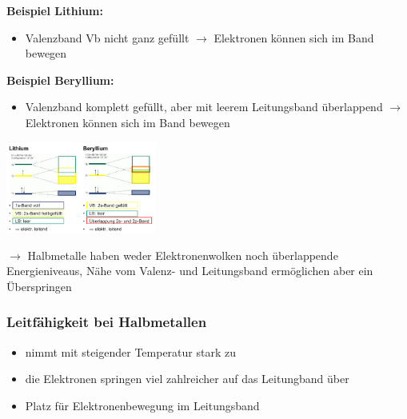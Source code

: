 \begin{minipage}{0.48\columnwidth}
	\textbf{Beispiel Lithium:}
	\begin{itemize}
		\item Valenzband Vb nicht ganz gefüllt
		$\rightarrow$ Elektronen können sich im Band bewegen
	\end{itemize}
\end{minipage}
 \hfill
\begin{minipage}{0.48\columnwidth}
	\textbf{Beispiel Beryllium:}
	\begin{itemize}
		\item Valenzband komplett gefüllt, aber mit leerem Leitungsband überlappend
		$\rightarrow$ Elektronen können sich im Band bewegen
	\end{itemize} 
\end{minipage}
\begin{center}
	\includegraphics[height=3cm]{images/Baender.png}
\end{center}

 $\rightarrow$ Halbmetalle haben weder Elektronenwolken noch überlappende Energieniveaus, Nähe vom Valenz- und Leitungsband ermöglichen aber ein Überspringen
\subsubsection{Leitfähigkeit bei Halbmetallen}
	\begin{itemize}
		\item nimmt mit steigender Temperatur stark zu
		\item die Elektronen springen viel zahlreicher auf das Leitungband über
		\item Platz für Elektronenbewegung im Leitungsband
	\end{itemize}
	
